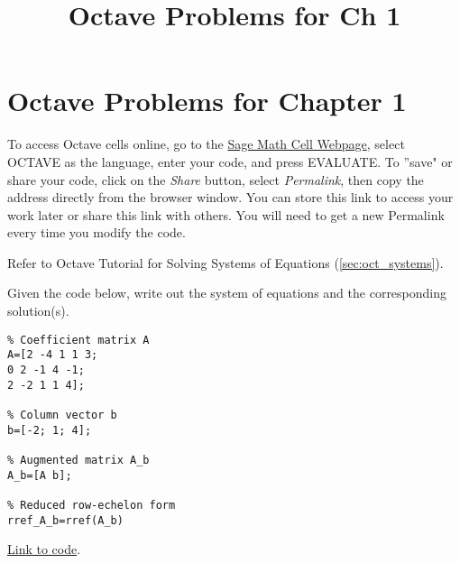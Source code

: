\documentclass{ximera}
\title{Octave Problems for Ch 1} \license{CC BY-NC-SA 4.0}
\begin{document}
\begin{abstract}
\end{abstract}
\maketitle

\section*{Octave Problems for Chapter 1}

To access Octave cells online, go to the \href{https://sagecell.sagemath.org/}{Sage Math Cell Webpage}, select OCTAVE as the language, enter your code, and press EVALUATE.  
To ''save" or share your code, click on the \emph{Share} button, select \emph{Permalink}, then copy the address directly from the browser window.  You can store this link to access your work later or share this link with others.  You will need to get a new Permalink every time you modify the code.

Refer to Octave Tutorial for Solving Systems of Equations (\ref{sec:oct_systems}).

\begin{problem}\label{prob_oct_0}
    Given the code below, write out the system of equations and the corresponding solution(s).

    \begin{verbatim}
% Coefficient matrix A
A=[2 -4 1 1 3;
0 2 -1 4 -1;
2 -2 1 1 4];

% Column vector b
b=[-2; 1; 4];

% Augmented matrix A_b
A_b=[A b];

% Reduced row-echelon form
rref_A_b=rref(A_b)
    \end{verbatim}

\href{https://sagecell.sagemath.org/?z=eJxFjcEKwjAQRO-B_MNcCnoI2NpbySH4B16LFJtuNNA0sKTq57sVVBaGGeaxU-GUKYToIy0F6Vo4vuC0crZvYFrUcsdOqwMk1mhFJIlvPlV7kaRVJV_mNS14kC-ZMWo12t40Heruz7j1lmSFpt_OIKCI7R3GL3WmafXCcH4a8nea84KQOWnFTGHY8M3sxOzf0oYzHQ==&lang=octave&interacts=eJyLjgUAARUAuQ==}{Link to code}.    
\end{problem}
\end{document}
